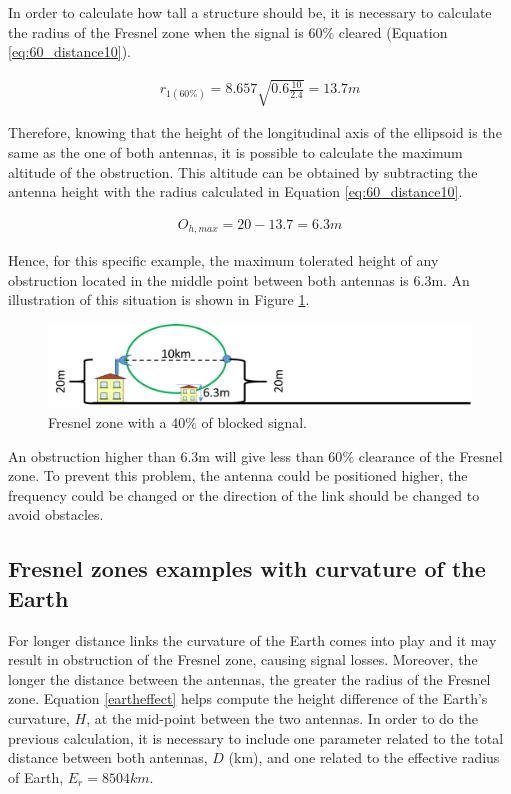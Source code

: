 In order to calculate how tall a structure should be, it is necessary to calculate the radius of the Fresnel zone when the signal is 60$\%$ cleared (Equation \ref{eq:60_distance10}).

\begin{align}
r_{1(60\%)} = 8.657\sqrt{0.6 \frac{10}{2.4}} = 13.7m\label{eq:60_distance10}
\end{align}
  
Therefore, knowing that the height of the longitudinal axis of the ellipsoid is the same as the one of both antennas, it is possible to calculate the maximum altitude of the obstruction. This altitude can be obtained by subtracting the antenna height with the radius calculated in Equation \ref{eq:60_distance10}.

\begin{align}
\text{$O_{h,max}$} = 20 - 13.7 = 6.3m\label{eq:height_obstruction}
\end{align}

Hence, for this specific example, the maximum tolerated height of any obstruction located in the middle point between both antennas is 6.3m. An illustration of this situation is shown in Figure \ref{fig:fresnel_zones_10km_60procent}.

\begin{figure}[H]
	\centering
	\includegraphics[scale=0.50]{figures/fresnel_10km_60procent.png}
	\caption{Fresnel zone with a 40$\%$ of blocked signal.}
	\label{fig:fresnel_zones_10km_60procent}
\end{figure}  

An obstruction higher than 6.3m will give less than 60$\%$ clearance of the Fresnel zone. To prevent this problem, the antenna could be positioned higher, the frequency could be changed or the direction of the link should be changed to avoid obstacles.

\subsection*{Fresnel zones examples with curvature of the Earth}
For longer distance links the curvature of the Earth comes into play and it may result in obstruction of the Fresnel zone, causing signal losses. Moreover, the longer the distance between the antennas, the greater the radius of the Fresnel zone. Equation \ref{eartheffect} helps compute the height difference of the Earth's curvature, $H$, at the mid-point between the two antennas. In order to do the previous calculation, it is necessary to include one parameter related to the total distance between both antennas, $D$ (km), and one related to the effective radius of Earth, $E_r = 8 504 km$.

